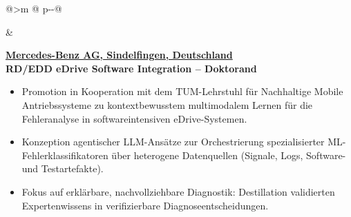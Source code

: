 \newlength{\datecol}
\setlength{\datecol}{2.7cm}   %

\newlength{\colgap}
\setlength{\colgap}{6mm}      %


\begin{tabular}{@{}>{\raggedleft\arraybackslash}m{\datecol} @{\hspace{\colgap}} p{\dimexpr\textwidth-\datecol-\colgap\relax}@{}}


 &
\begin{minipage}[t]{\linewidth}\vspace{0pt}
\begin{expblock}
  \footnotesize
  \setlength{\parindent}{0pt}\setlength{\parskip}{0pt}
  \textbf{\href{https://group.mercedes-benz.com}{Mercedes-Benz AG, Sindelfingen, Deutschland}}\\[-0.1em]
  \textbf{RD/EDD eDrive Software Integration – Doktorand}\\[-1em]
  \begin{itemize}[nosep,leftmargin=1em]
    \item Promotion in Kooperation mit dem TUM-Lehrstuhl für Nachhaltige Mobile Antriebssysteme zu kontextbewusstem multimodalem Lernen für die Fehleranalyse in softwareintensiven eDrive-Systemen.
    \item Konzeption agentischer LLM-Ansätze zur Orchestrierung spezialisierter ML-Fehlerklassifikatoren über heterogene Datenquellen (Signale, Logs, Software- und Testartefakte).
    \item Fokus auf erklärbare, nachvollziehbare Diagnostik: Destillation validierten Expertenwissens in verifizierbare Diagnoseentscheidungen.
  \end{itemize}
\end{expblock}
\end{minipage}
\\[-0.2em]


\end{tabular}
